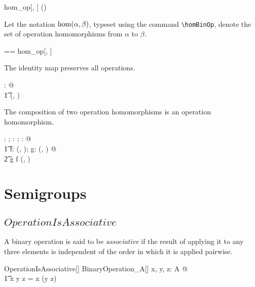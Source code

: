 \documentclass{amsart}
\begin{document}
\begin{remark}
\begin{zed}
	hom\_op[\setT, \setU] \in \binop \setT \cross \binop \setU \fun \power (\setT \pfun \setU)
\end{zed}
\end{remark}

Let the notation $\operatorname{hom}(\alpha, \beta)$,  typeset using the command \verb|\homBinOp|, 
denote the set of operation homomorphisms from $\alpha$ to $\beta$.

\begin{zed}
	\homBinOp[\genT, \genU] == hom\_op[\genT, \genU]
\end{zed}

\begin{remark}
The identity map preserves all operations.
\begin{zed}
	\forall \strucA: \binop \setX @ \\
	\t1	\id \setX \in \homBinOp(\strucA, \strucA)
\end{zed}
\end{remark}

\begin{remark}
The composition of two operation homomorphisms is an operation homomorphism.
\begin{zed}
	\forall \strucA: \binop \setX; \strucB: \binop \setY; \strucC: \binop \setZ @ \\
	\t1	\forall f: \homBinOp(\strucA, \strucB); g: \homBinOp(\strucB, \strucC) @ \\
	\t2		g \circ f \in \homBinOp(\strucA, \strucC)
\end{zed}
\end{remark}

\section{Semigroups}

\subsection{$OperationIsAssociative$}

A binary operation is said to be \textit{associative} if the result of applying it to any three elements
is independent of the order in which it is applied pairwise.

\begin{schema}{OperationIsAssociative}[\genT]
	BinaryOperation\_A[\genT]
\where
	\forall x, y, z: A @ \\
	\t1	x \mulA y \mulA z = x \mulA (y \mulA z)
\end{schema}
\end{document}
